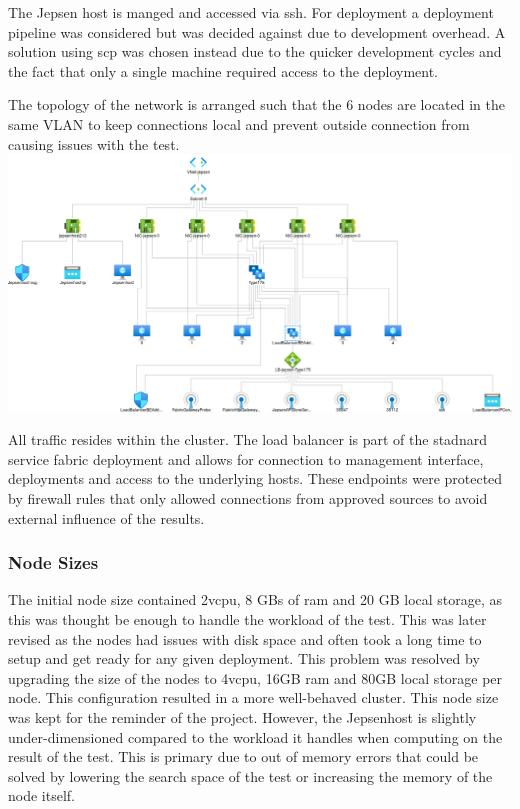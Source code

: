 \documentclass[a4paper,10pt,titlepage]{report}
\begin{document}
    The Jepsen host is manged and accessed via ssh. For deployment a deployment pipeline was considered but was decided against due to development overhead. A solution using scp was chosen instead due to the quicker development cycles and the fact that only a single machine required access to the deployment. 
    

    The topology of the network is arranged such that the 6 nodes are located in the same VLAN to keep connections local and prevent outside connection from causing issues with the test.\\
    \includegraphics[scale=0.3]{images/topology.png}
    \\

    All traffic resides within the cluster. The load balancer is part of the stadnard service fabric deployment and allows for connection to management interface, deployments and access to the underlying hosts. These endpoints were protected by firewall rules that only allowed connections from approved sources to avoid external influence of the results.

    \subsubsection*{Node Sizes}

    The initial node size contained 2vcpu, 8 GBs of ram and 20 GB local storage, as this was thought be enough to handle the workload of the test. This was later revised as the nodes had issues with disk space and often took a long time to setup and get ready for any given deployment. This problem was resolved by upgrading the size of the nodes to 4vcpu, 16GB ram and 80GB local storage per node. This configuration resulted in a more well-behaved cluster. This node size was kept for the reminder of the project. However, the Jepsenhost is slightly under-dimensioned compared to the workload it handles when computing on the result of the test. This is primary due to out of memory errors that could be solved by lowering the search space of the test or increasing the memory of the node itself.
\end{document}
